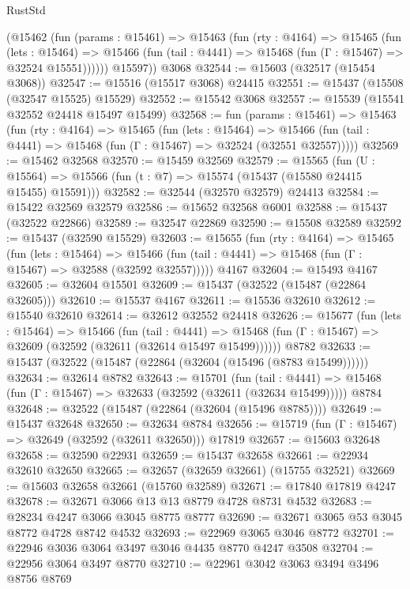\begin{lexlean}{RustStd}
\begin{coremodule}
        (@15462
          (fun (params : @15461) =>
          @15463
            (fun (rty : @4164) =>
            @15465
              (fun (lets : @15464) =>
              @15466 (fun (tail : @4441) => @15468 (fun (Γ : @15467) => @32524 @15551))))))
        @15597))
    @3068
@32544 := @15603 (@32517 (@15454 @3068))
@32547 := @15516 (@15517 @3068) @24415
@32551 := @15437 (@15508 (@32547 @15525) @15529)
@32552 := @15542 @3068
@32557 := @15539 (@15541 @32552 @24418 @15497 @15499)
@32568 := fun (params : @15461) =>
  @15463
    (fun (rty : @4164) =>
    @15465
      (fun (lets : @15464) =>
      @15466 (fun (tail : @4441) => @15468 (fun (Γ : @15467) => @32524 (@32551 @32557)))))
@32569 := @15462 @32568
@32570 := @15459 @32569
@32579 := @15565
    (fun (U : @15564) => @15566 (fun (t : @7) => @15574 (@15437 (@15580 @24415 @15455) @15591)))
@32582 := @32544 (@32570 @32579) @24413
@32584 := @15422 @32569 @32579
@32586 := @15652 @32568 @6001
@32588 := @15437 (@32522 @22866)
@32589 := @32547 @22869
@32590 := @15508 @32589
@32592 := @15437 (@32590 @15529)
@32603 := @15655
    (fun (rty : @4164) =>
    @15465
      (fun (lets : @15464) =>
      @15466 (fun (tail : @4441) => @15468 (fun (Γ : @15467) => @32588 (@32592 @32557)))))
    @4167
@32604 := @15493 @4167
@32605 := @32604 @15501
@32609 := @15437 (@32522 (@15487 (@22864 @32605)))
@32610 := @15537 @4167
@32611 := @15536 @32610
@32612 := @15540 @32610
@32614 := @32612 @32552 @24418
@32626 := @15677
    (fun (lets : @15464) =>
    @15466
      (fun (tail : @4441) =>
      @15468 (fun (Γ : @15467) => @32609 (@32592 (@32611 (@32614 @15497 @15499))))))
    @8782
@32633 := @15437 (@32522 (@15487 (@22864 (@32604 (@15496 (@8783 @15499))))))
@32634 := @32614 @8782
@32643 := @15701
    (fun (tail : @4441) => @15468 (fun (Γ : @15467) => @32633 (@32592 (@32611 (@32634 @15499)))))
    @8784
@32648 := @32522 (@15487 (@22864 (@32604 (@15496 @8785))))
@32649 := @15437 @32648
@32650 := @32634 @8784
@32656 := @15719 (fun (Γ : @15467) => @32649 (@32592 (@32611 @32650))) @17819
@32657 := @15603 @32648
@32658 := @32590 @22931
@32659 := @15437 @32658
@32661 := @22934 @32610 @32650
@32665 := @32657 (@32659 @32661) (@15755 @32521)
@32669 := @15603 @32658 @32661 (@15760 @32589)
@32671 := @17840 @17819 @4247
@32678 := @32671 @3066 @13 @13 @8779 @4728 @8731 @4532
@32683 := @28234 @4247 @3066 @3045 @8775 @8777
@32690 := @32671 @3065 @53 @3045 @8772 @4728 @8742 @4532
@32693 := @22969 @3065 @3046 @8772
@32701 := @22946 @3036 @3064 @3497 @3046 @4435 @8770 @4247 @3508
@32704 := @22956 @3064 @3497 @8770
@32710 := @22961 @3042 @3063 @3494 @3496 @8756 @8769

\end{coremodule}
\end{lexlean}
